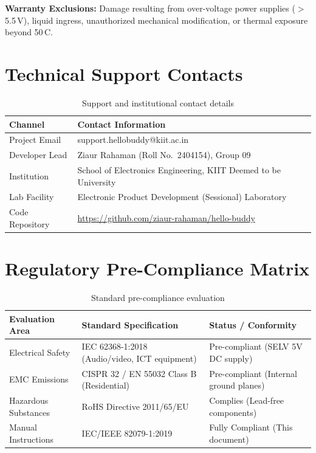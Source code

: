 \documentclass[11pt,a4paper,oneside]{report}
\makeatletter
\newcommand{\hdr}[1]{\cellcolor{LightBlue}\textbf{#1}}
\newcommand{\SupportMail}{support.hellobuddy@kiit.ac.in}
\makeatother
\begin{document}
\textbf{Warranty Exclusions:} Damage resulting from over-voltage power supplies ($>$5.5\,V), liquid ingress, unauthorized mechanical modification, or thermal exposure beyond 50\,\textdegree C.

\section{Technical Support Contacts}
\begin{table}[H]\centering\small
\caption{Support and institutional contact details}
\begin{tabular}{|l|l|}\hline
\hdr{Channel} & \hdr{Contact Information}\\ \hline
Project Email & \SupportMail \\ \hline
Developer Lead & Ziaur Rahaman (Roll No.\ 2404154), Group 09 \\ \hline
Institution & School of Electronics Engineering, KIIT Deemed to be University \\ \hline
Lab Facility & Electronic Product Development (Sessional) Laboratory \\ \hline
Code Repository & \url{https://github.com/ziaur-rahaman/hello-buddy} \\ \hline
\end{tabular}
\end{table}

\section{Regulatory Pre-Compliance Matrix}
\begin{table}[H]\centering\small
\caption{Standard pre-compliance evaluation}
\begin{tabularx}{\linewidth}{|l|l|l|}\hline
\hdr{Evaluation Area} & \hdr{Standard Specification} & \hdr{Status / Conformity}\\ \hline
Electrical Safety & IEC 62368-1:2018 (Audio/video, ICT equipment) & Pre-compliant (SELV 5V DC supply) \\ \hline
EMC Emissions & CISPR 32 / EN 55032 Class B (Residential) & Pre-compliant (Internal ground planes) \\ \hline
Hazardous Substances & RoHS Directive 2011/65/EU & Complies (Lead-free components) \\ \hline
Manual Instructions & IEC/IEEE 82079-1:2019 & Fully Compliant (This document) \\ \hline
\end{tabularx}
\end{table}
\end{document}
